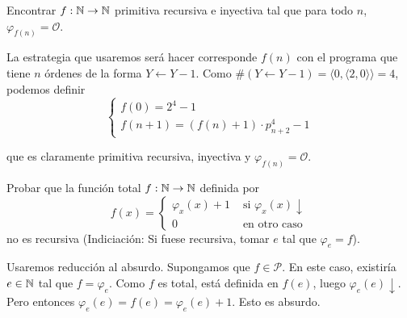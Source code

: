 \documentclass[twoside]{article}
\begin{document}
\newpage
\begin{ejercicio}{8}
Encontrar $f : \mathbb{N} \to \mathbb{N}$ primitiva recursiva e inyectiva tal que para todo $n$, $φ_{f(n)} = \mathcal{O}$.
\end{ejercicio}
\begin{solucion}
La estrategia que usaremos será hacer corresponde $f(n)$ con el programa que tiene $n$ órdenes de la forma $Y \leftarrow Y-1$. Como $\#(Y \leftarrow Y-1) = \langle 0, \langle 2,0\rangle \rangle = 4$, podemos definir
\[\begin{cases}
	f(0) = 2^4-1 \\
	f(n+1) = (f(n)+1)\cdot p_{n+2}^4-1
\end{cases}\]
\end{solucion}
que es claramente primitiva recursiva, inyectiva y $φ_{f(n)} = \mathcal{O}$.

\newpage
\begin{ejercicio}{9}
Probar que la función total $f : \mathbb{N} \to \mathbb{N}$ definida por
\[ f(x) = \begin{cases}
	φ_x(x)+1 &\text{ si }φ_x(x) \downarrow\\
	0 & \text{ en otro caso}
\end{cases}\]
no es recursiva (Indiciación: Si fuese recursiva, tomar $e$ tal que $φ_e = f$).
\end{ejercicio}
\begin{solucion}
Usaremos reducción al absurdo. Supongamos que $f \in \mathcal{P}$. En este caso, existiría $e \in \mathbb{N}$ tal que $f = φ_e$. Como $f$ es total, está definida en $f(e)$, luego $φ_e(e)\downarrow$. Pero entonces $φ_e(e) = f(e) = φ_e(e)+1$. Esto es absurdo.
\end{solucion}

\newpage
\end{document}

